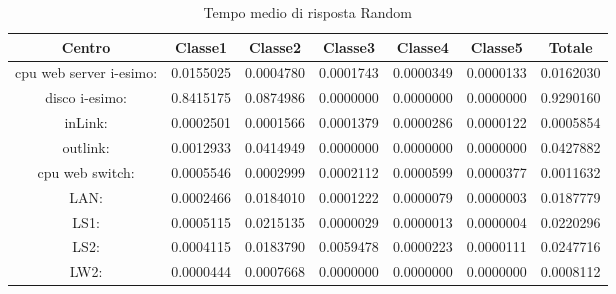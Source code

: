 \begin{table}[H]
\begin{center}\begin{scriptsize}
\begin{tabular}{||c|c|c|c|c|c|c||}
\hline
Centro &Classe1 &Classe2 &Classe3 &Classe4 &Classe5 &Totale\\
\hline
\hline
 cpu web server i-esimo: 	&0.0155025	&0.0004780	&0.0001743	&0.0000349	&0.0000133	&0.0162030\\
\hline
 disco i-esimo: 	&0.8415175	&0.0874986	&0.0000000	&0.0000000	&0.0000000	&0.9290160\\
\hline
 inLink: 	&0.0002501	&0.0001566	&0.0001379	&0.0000286	&0.0000122	&0.0005854\\
\hline
 outlink: 	&0.0012933	&0.0414949	&0.0000000	&0.0000000	&0.0000000	&0.0427882\\
\hline
 cpu web switch: 	&0.0005546	&0.0002999	&0.0002112	&0.0000599	&0.0000377	&0.0011632\\
\hline
 LAN: 	&0.0002466	&0.0184010	&0.0001222	&0.0000079	&0.0000003	&0.0187779\\
\hline
 LS1: 	&0.0005115	&0.0215135	&0.0000029	&0.0000013	&0.0000004	&0.0220296\\
\hline
 LS2: 	&0.0004115	&0.0183790	&0.0059478	&0.0000223	&0.0000111	&0.0247716\\
\hline
 LW2: 	&0.0000444	&0.0007668	&0.0000000	&0.0000000	&0.0000000	&0.0008112\\
\hline
\end{tabular}
\end{scriptsize}\end{center}
\caption{Tempo medio di risposta Random}
\label{tempomediorisposta}
\end{table}

